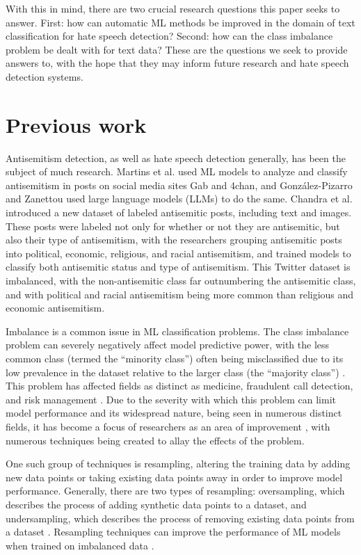 \documentclass[runningheads]{llncs}
\begin{document}
With this in mind, there are two crucial research questions this paper seeks to answer. First: how can automatic ML methods be improved in the domain of text classification for hate speech detection? Second: how can the class imbalance problem be dealt with for text data? These are the questions we seek to provide answers to, with the hope that they may inform future research and hate speech detection systems.

\section{Previous work}
Antisemitism detection, as well as hate speech detection generally, has been the subject of much research. Martins et al. \cite{martins} used ML models to analyze and classify antisemitism in posts on social media sites Gab and 4chan, and González-Pizarro and Zanettou \cite{gonzalez} used large language models (LLMs) to do the same. Chandra et al. \cite{chandra} introduced a new dataset of labeled antisemitic posts, including text and images. These posts were labeled not only for whether or not they are antisemitic, but also their type of antisemitism, with the researchers grouping antisemitic posts into political, economic, religious, and racial antisemitism, and trained models to classify both antisemitic status and type of antisemitism. This Twitter dataset is imbalanced, with the non-antisemitic class far outnumbering the antisemitic class, and with political and racial antisemitism being more common than religious and economic antisemitism.

Imbalance is a common issue in ML classification problems. The class imbalance problem can severely negatively affect model predictive power, with the less common class (termed the ``minority class'') often being misclassified due to its low prevalence in the dataset relative to the larger class (the ``majority class'') \cite{abdelrahman}. This problem has affected fields as distinct as medicine, fraudulent call detection, and risk management \cite{sun}. Due to the severity with which this problem can limit model performance and its widespread nature, being seen in numerous distinct fields, it has become a focus of researchers as an area of improvement \cite{abdelrahman}, with numerous techniques being created to allay the effects of the problem.

One such group of techniques is resampling, altering the training data by adding new data points or taking existing data points away in order to improve model performance. Generally, there are two types of resampling: oversampling, which describes the process of adding synthetic data points to a dataset, and undersampling, which describes the process of removing existing data points from a dataset \cite{shelke}. Resampling techniques can improve the performance of ML models when trained on imbalanced data \cite{lee} \cite{khushi}.
\end{document}
